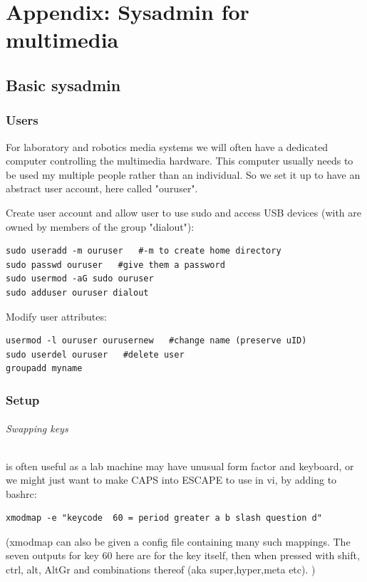 \documentclass[oneside,english]{scrbook}
\begin{document}
\part{Appendix: Sysadmin for multimedia}

\chapter{Basic sysadmin}

\section{Users}
For laboratory and robotics media systems we will often have a dedicated computer controlling the multimedia hardware.  This computer usually needs to be used my multiple people rather than an individual.   So we set it up to have an abstract user account, here called "ouruser".

Create user account and allow user to use sudo and access USB devices (with are owned by members of the group "dialout"):
\begin{lstlisting}
sudo useradd -m ouruser   #-m to create home directory
sudo passwd ouruser   #give them a password
sudo usermod -aG sudo ouruser
sudo adduser ouruser dialout
\end{lstlisting}

Modify user attributes:
\begin{lstlisting}
usermod -l ouruser ourusernew   #change name (preserve uID)
sudo userdel ouruser   #delete user
groupadd myname
\end{lstlisting}



\section{Setup}

\paragraph{Swapping keys} is often useful as a lab machine may have unusual form factor and keyboard, or we might just want to make CAPS into ESCAPE to use in vi, by adding to bashrc:

\begin{lstlisting}
xmodmap -e "keycode  60 = period greater a b slash question d"
\end{lstlisting}
(xmodmap can also be given a config file containing many such mappings.  The seven outputs for key 60 here are for the key itself, then when pressed with shift, ctrl, alt, AltGr and combinations thereof (aka super,hyper,meta etc). )
\end{document}
